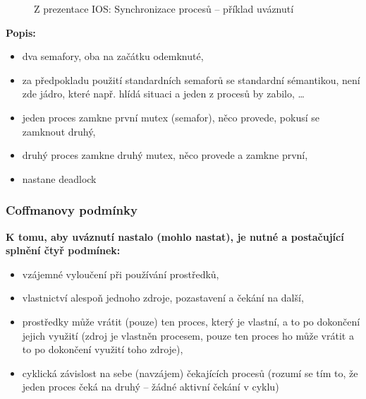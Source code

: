 \documentclass[a4paper, 11pt]{article}
\begin{document}
\newpage

\begin{figure} [htb]
    \centering
    \caption{Z prezentace IOS: Synchronizace procesů -- příklad uváznutí}
\end{figure}

\textbf{Popis:}
\begin{itemize}
    \item dva semafory, oba na začátku odemknuté,
    \item za předpokladu použití standardních semaforů se standardní sémantikou, není zde jádro, které např. hlídá situaci a jeden z procesů by zabilo, \ldots
    \item jeden proces zamkne první mutex (semafor), něco provede, pokusí se zamknout druhý,
    \item druhý proces zamkne druhý mutex, něco provede a zamkne první,
    \item nastane deadlock
\end{itemize}

\subsubsection{Coffmanovy podmínky}

\textbf{K tomu, aby uváznutí nastalo (mohlo nastat), je nutné a postačující splnění čtyř podmínek:}
\begin{itemize}
    \item vzájemné vyloučení při používání prostředků,
    \item vlastnictví alespoň jednoho zdroje, pozastavení a čekání na další,
    \item prostředky může vrátit (pouze) ten proces, který je vlastní, a to po dokončení jejich využití (zdroj je vlastněn procesem, pouze ten proces ho může vrátit a to po dokončení využití toho zdroje),
    \item cyklická závislost na sebe (navzájem) čekajících procesů (rozumí se tím to, že jeden proces čeká na druhý -- žádné aktivní čekání v cyklu)
\end{itemize}
\end{document}

